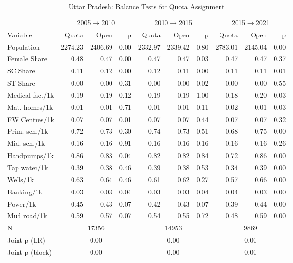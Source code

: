 \begin{table}[htbp]
\caption{Uttar Pradesh: Balance Tests for Quota Assignment}
\label{tab:balance_up_2005_2010}
{\centering\scriptsize
\begin{tabular}{@{}lrrr rrr rrr@{}}
\toprule
& \multicolumn{3}{c}{2005$\rightarrow$2010} & \multicolumn{3}{c}{2010$\rightarrow$2015} & \multicolumn{3}{c}{2015$\rightarrow$2021} \\
\cmidrule(lr){2-4} \cmidrule(lr){5-7} \cmidrule(lr){8-10}
Variable & Quota & Open & p & Quota & Open & p & Quota & Open & p \\
\midrule
Population & 2274.23 & 2406.69 & 0.00 & 2332.97 & 2339.42 & 0.80 & 2783.01 & 2145.04 & 0.00 \\
Female Share & 0.48 & 0.47 & 0.00 & 0.47 & 0.47 & 0.03 & 0.47 & 0.47 & 0.37 \\
SC Share & 0.11 & 0.12 & 0.00 & 0.12 & 0.11 & 0.00 & 0.11 & 0.11 & 0.01 \\
ST Share & 0.00 & 0.00 & 0.31 & 0.00 & 0.00 & 0.02 & 0.00 & 0.00 & 0.55 \\
Medical fac./1k & 0.19 & 0.19 & 0.12 & 0.19 & 0.19 & 1.00 & 0.18 & 0.20 & 0.03 \\
Mat. homes/1k & 0.01 & 0.01 & 0.71 & 0.01 & 0.01 & 0.11 & 0.02 & 0.01 & 0.03 \\
FW Centres/1k & 0.07 & 0.07 & 0.01 & 0.07 & 0.07 & 0.44 & 0.07 & 0.07 & 0.32 \\
Prim. sch./1k & 0.72 & 0.73 & 0.30 & 0.74 & 0.73 & 0.51 & 0.68 & 0.75 & 0.00 \\
Mid. sch./1k & 0.16 & 0.16 & 0.91 & 0.16 & 0.16 & 0.16 & 0.16 & 0.16 & 0.26 \\
Handpumps/1k & 0.86 & 0.83 & 0.04 & 0.82 & 0.82 & 0.84 & 0.72 & 0.86 & 0.00 \\
Tap water/1k & 0.39 & 0.38 & 0.46 & 0.39 & 0.38 & 0.53 & 0.34 & 0.39 & 0.00 \\
Wells/1k & 0.63 & 0.64 & 0.46 & 0.61 & 0.62 & 0.27 & 0.57 & 0.66 & 0.00 \\
Banking/1k & 0.03 & 0.03 & 0.04 & 0.03 & 0.03 & 0.04 & 0.04 & 0.03 & 0.00 \\
Power/1k & 0.45 & 0.43 & 0.07 & 0.42 & 0.43 & 0.07 & 0.39 & 0.44 & 0.00 \\
Mud road/1k & 0.59 & 0.57 & 0.07 & 0.54 & 0.55 & 0.72 & 0.48 & 0.59 & 0.00 \\
\midrule
N & \multicolumn{3}{c}{17356} & \multicolumn{3}{c}{14953} & \multicolumn{3}{c}{9869} \\
Joint p (LR) & \multicolumn{3}{c}{0.00} & \multicolumn{3}{c}{0.00} & \multicolumn{3}{c}{0.00} \\
Joint p (block) & \multicolumn{3}{c}{0.00} & \multicolumn{3}{c}{0.00} & \multicolumn{3}{c}{0.00} \\
\bottomrule
\end{tabular}
\par}


\end{table}
